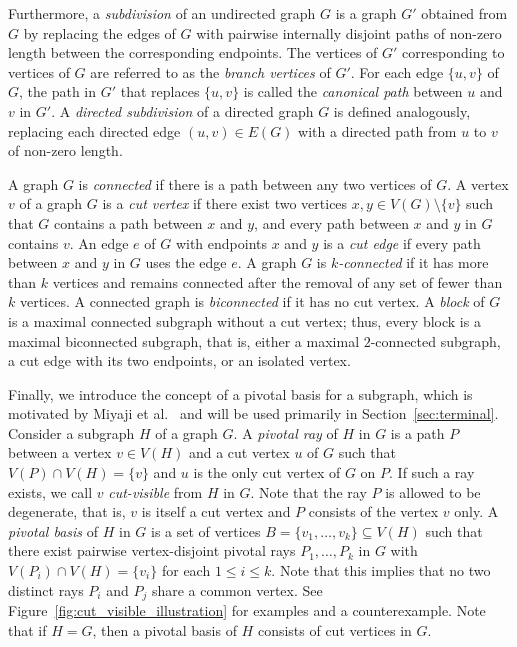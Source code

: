 \documentclass[pdflatex,sn-mathphys-num]{sn-jnl}
\theoremstyle{thmstyleone}%
\theoremstyle{thmstyletwo}%
\theoremstyle{thmstylethree}%
\begin{document}
Furthermore, a \emph{subdivision} of an undirected graph $G$ is a graph $G'$ obtained from $G$ by replacing the edges of $G$ with pairwise internally disjoint paths of non-zero length between the corresponding endpoints. The vertices of $G'$ corresponding to vertices of $G$ are referred to as the \emph{branch vertices} of $G'$.
For each edge $\{u, v\}$ of $G$, the path in $G'$ that replaces $\{u, v\}$ is called the \emph{canonical path} between $u$ and $v$ in $G'$. A \emph{directed subdivision} of a directed graph $G$ is defined analogously, replacing each directed edge $(u,v) \in E(G)$ with a directed path from $u$ to $v$ of non-zero length. 
 


A graph $G$ is \emph{connected} if there is a path between any two vertices of $G$. A vertex $v$ of a graph $G$ is a \emph{cut vertex} if there exist two vertices $x,y \in V(G)\setminus\{v\}$ such that $G$ contains a path between $x$ and $y$, and every path between $x$ and $y$ in $G$ contains $v$. An edge $e$ of $G$ with endpoints $x$ and $y$ is a \emph{cut edge} if every path between $x$ and $y$ in $G$ uses the edge $e$. A graph $G$ is \emph{$k$-connected} if it has more than $k$ vertices and remains connected after the removal of any set of fewer than $k$ vertices. A connected graph is \emph{biconnected} if it has no cut vertex. A \emph{block} of $G$ is a maximal connected subgraph without a cut vertex; thus, every block is a maximal biconnected subgraph, that is, either a maximal $2$-connected subgraph, a cut edge with its two endpoints, or an isolated vertex.


Finally, we introduce the concept of a pivotal basis for a subgraph, which is motivated by Miyaji et al.~\cite{Miyaji2026} and will be used primarily in Section~\ref{sec:terminal}. 
Consider a subgraph $H$ of a graph $G$. A \emph{pivotal ray} of $H$ in $G$ is a path $P$ between a vertex $v\in V(H)$ and a cut vertex $u$ of $G$ such that $V(P) \cap V(H) = \{v\}$ and $u$ is the only cut vertex of $G$ on $P$. 
If such a ray exists, we call $v$ \emph{cut-visible} from $H$ in $G$.  Note that the ray $P$ is allowed to be degenerate, that is, $v$ is itself a cut vertex and $P$ consists of the vertex $v$ only.
A \emph{pivotal basis} of $H$ in $G$ is a set of vertices
$B = \{v_1, \dots, v_k\} \subseteq V(H)$ such that there exist pairwise vertex-disjoint pivotal rays $P_1, \dots, P_k$ in $G$ with
$V(P_i) \cap V(H) = \{v_i\}$ for each $1 \le i \le k$. Note that this implies that no two distinct rays $P_i$ and $P_j$ share a common vertex. See Figure~\ref{fig:cut_visible_illustration} for examples and a counterexample. 
Note that if $H=G$, then a pivotal basis of $H$ consists of cut vertices in $G$.
\end{document}
